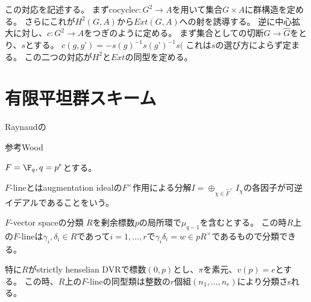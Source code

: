 \documentclass{jsarticle}
\begin{document}
この対応を記述する。
まずcocycle$c:G^2 \to A$を用いて集合$G \times A$に群構造を定める。
さらにこれが$H^2(G,A)$から$Ext(G,A)$への射を誘導する。
逆に中心拡大に対し、$c:G^2 \to A$をつぎのように定める。
まず集合としての切断$G \to \hat{G}$をとり、$s$とする。
$c(g,g’)=-s(g)^{-1}s(g’)^{-1}s($
これは$s$の選び方によらず定まる。
この二つの対応が$H^2$と$Ext$の同型を定める。

\section{有限平坦群スキーム}
Raynaudの

参考Wood

$F=\F_q, q=p^r$とする。

$F$-lineとはaugmentation idealの$F^\times$作用による分解$I=\oplus_{\chi\in\hat{F}^\times}I_\chi$の各因子が可逆イデアルであることをいう。

$F$-vector spaceの分類
$R$を剰余標数$p$の局所環で$\mu_{q-1}$を含むとする。
この時$R$上の$F$-lineは$\gamma_i, \delta_i\in R$であって$i=1,\ldots,r$で$\gamma_i\delta_i=w\in pR^\times$であるもので分類できる。

特に$R$がstrictly henselian DVRで標数$(0,p)$とし、$\pi$を素元、$v(p)=e$とする。
この時、$R$上の$F$-lineの同型類は整数の$r$個組$(n_1,\ldots,n_r)$により分類さsれる。
\end{document}
